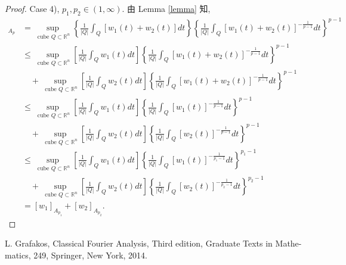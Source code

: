\documentclass[a4paper,11pt]{article}
\theoremstyle{definition}
\begin{document}
\begin{CJK*}{UTF8}{gbsn}
\begin{proof}
    Case 4), $ p_1, p_2 \in (1, \infty) $. 由 Lemma \ref{lemma} 知,
    \begin{align*}
        [w_1 + w_2]_{A_p} 
            &= \sup_{\text{ cube } Q \subset \mathbb{R}^n} 
                \left\{ \frac{1}{|Q|} \int_Q [w_1(t) + w_2(t)] dt \right\}
                \left\{ \frac{1}{|Q|} \int_Q [w_1(t) + w_2(t)]^{-\frac{1}{p - 1}}dt \right\}^{p - 1} \\
            &\leq \sup_{\text{ cube } Q \subset \mathbb{R}^n} 
                \left[ \frac{1}{|Q|} \int_Q w_1(t)  dt \right]
                \left\{ \frac{1}{|Q|} \int_Q [w_1(t) + w_2(t)]^{-\frac{1}{p - 1}}dt \right\}^{p - 1} \\
                &\quad+ \sup_{\text{ cube } Q \subset \mathbb{R}^n} 
                    \left[ \frac{1}{|Q|} \int_Q w_2(t)  dt \right] 
                    \left\{ \frac{1}{|Q|} \int_Q [w_1(t) + w_2(t)]^{-\frac{1}{p - 1}}dt \right\}^{p - 1} \\
            &\leq \sup_{\text{ cube } Q \subset \mathbb{R}^n} 
                \left[ \frac{1}{|Q|} \int_Q w_1(t)  dt \right]
                \left\{ \frac{1}{|Q|} \int_Q [w_1(t)]^{-\frac{1}{p - 1}}dt \right\}^{p - 1} \\
                &\quad+ \sup_{\text{ cube } Q \subset \mathbb{R}^n} 
                    \left[ \frac{1}{|Q|} \int_Q w_2(t)  dt \right] 
                    \left\{ \frac{1}{|Q|} \int_Q [w_2(t)]^{-\frac{1}{p - 1}}dt \right\}^{p - 1} \\
            &\leq \sup_{\text{ cube } Q \subset \mathbb{R}^n} 
                \left[ \frac{1}{|Q|} \int_Q w_1(t)  dt \right]
                \left\{ \frac{1}{|Q|} \int_Q [w_1(t)]^{-\frac{1}{p_1 - 1}}dt \right\}^{p_1 - 1} \\
                &\quad+ \sup_{\text{ cube } Q \subset \mathbb{R}^n} 
                    \left[ \frac{1}{|Q|} \int_Q w_2(t)  dt \right] 
                    \left\{ \frac{1}{|Q|} \int_Q [w_2(t)]^{-\frac{1}{p_2 - 1}}dt \right\}^{p_2 - 1} \\
            &= [w_1]_{A_{p_1}} + [w_2]_{A_{p_2}}.
    \end{align*}
\end{proof}


\begin{thebibliography}{99}

      L. Grafakos, Classical Fourier Analysis, Third edition, Graduate Texts in Mathe-
    matics, 249, Springer, New York, 2014.
    
\end{thebibliography}

\end{CJK*}
\end{document}
